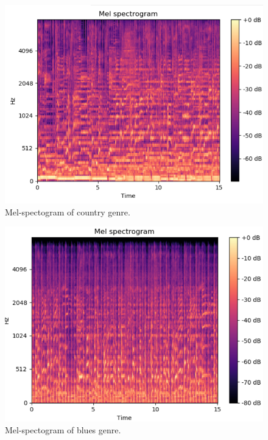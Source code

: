 \begin{figure}
\begin{center}
\includegraphics[scale=0.2]{./figures/country.png}
\end{center}
\caption
{
Mel-spectogram of country genre. 
}
\label{fig:big_picture4}
\end{figure}

\begin{figure}
\begin{center}
\includegraphics[scale=0.2]{./figures/blues.png}
\end{center}
\caption
{
Mel-spectogram of blues genre. 
}
\label{fig:big_picture5}
\end{figure}

